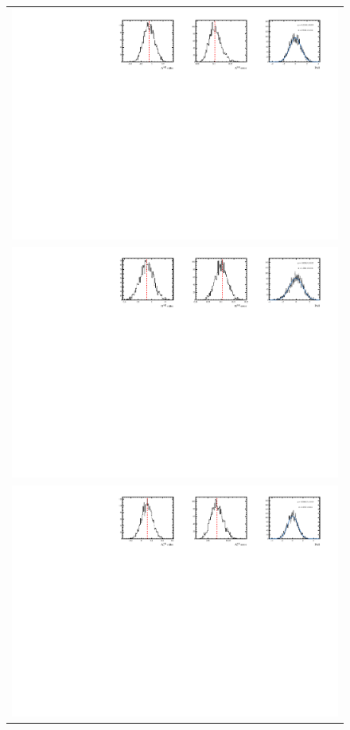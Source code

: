 \begin{figure}
  \centering
  \begin{tabular}{c}
\includegraphics[width=\textwidth]{ANA_resources/Plots/Data_fit/FitterBias//CombinedRuns//A_signal_KK.pdf} \\
\includegraphics[width=\textwidth]{ANA_resources/Plots/Data_fit/FitterBias//CombinedRuns//R_signal_KK.pdf} \\
\includegraphics[width=\textwidth]{ANA_resources/Plots/Data_fit/FitterBias//CombinedRuns//A_Bs_KK.pdf} \\

\end{tabular}
\end{figure}
